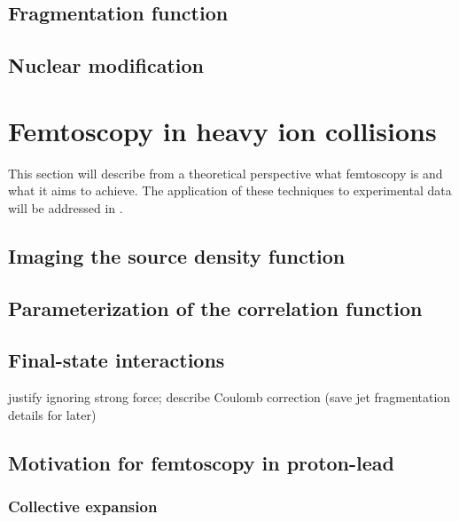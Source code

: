 \subsection{Fragmentation function}
\subsection{Nuclear modification}


\section{Femtoscopy in heavy ion collisions}
This section will describe from a theoretical perspective what femtoscopy is and what it aims to achieve. The application of these techniques to experimental data will be addressed in .
\subsection{Imaging the source density function}
\subsection{Parameterization of the correlation function}
\subsection{Final-state interactions}
justify ignoring strong force; describe Coulomb correction (save jet fragmentation details for later)
\subsection{Motivation for femtoscopy in proton-lead}
\subsubsection{Collective expansion}


